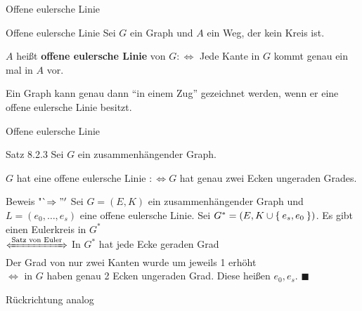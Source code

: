 \begin{frame}{Offene eulersche Linie}
\begin{block}{Offene eulersche Linie}
Sei $G$ ein Graph und $A$ ein Weg, der kein Kreis ist.

$A$ heißt \textbf{offene eulersche Linie} von $G :\Leftrightarrow$ Jede Kante
in $G$ kommt genau ein mal in $A$ vor.
\end{block}

Ein Graph kann genau dann "`in einem Zug"' gezeichnet werden, wenn er eine
offene eulersche Linie besitzt.
\end{frame}

\begin{frame}{Offene eulersche Linie}
\begin{block}{Satz 8.2.3}
Sei $G$ ein zusammenhängender Graph.

$G$ hat eine offene eulersche Linie $:\Leftrightarrow G$ hat genau zwei Ecken
ungeraden Grades.
\end{block}

\pause

\begin{block}{Beweis "`$\Rightarrow"'$}
Sei $G=(E, K)$ ein zusammenhängender Graph und $L = (e_0, \dots, e_s)$ eine offene
eulersche Linie. \pause
Sei $G^* = (E, K \cup \Set{e_s, e_0})$. \pause
Es gibt einen Eulerkreis in $G^*$ \pause \\
$\xLeftrightarrow{\text{Satz von Euler}}$ In $G^*$ hat jede Ecke geraden Grad \pause \\
Der Grad von nur zwei Kanten wurde um jeweils 1 erhöht \pause \\
$\Leftrightarrow$ in $G$ haben genau 2 Ecken ungeraden Grad. Diese heißen $e_0, e_s$. $\blacksquare$
\end{block}

\pause
Rückrichtung analog
\end{frame}

